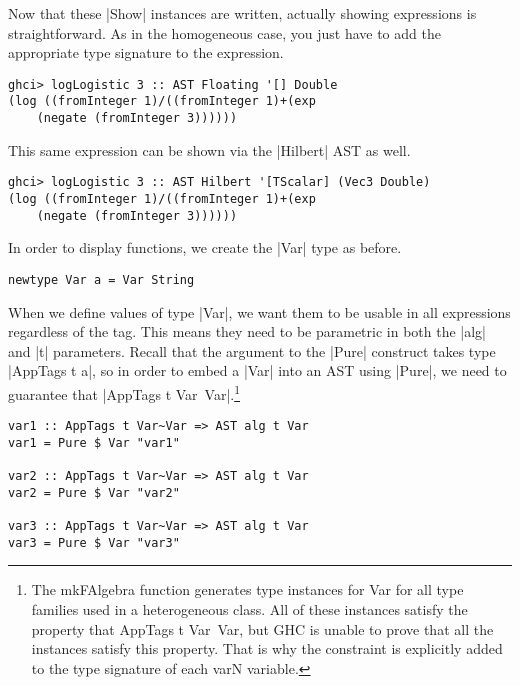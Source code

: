 \documentclass[preprint]{sigplanconf}
\theoremstyle{definition}
\begin{document}
Now that these |Show| instances are written,
actually showing expressions is straightforward.
As in the homogeneous case,
you just have to add the appropriate type signature to the expression.
\begin{lstlisting}
ghci> logLogistic 3 :: AST Floating '[] Double
(log ((fromInteger 1)/((fromInteger 1)+(exp
    (negate (fromInteger 3))))))
\end{lstlisting}
This same expression can be shown via the |Hilbert| AST as well.
\begin{lstlisting}
ghci> logLogistic 3 :: AST Hilbert '[TScalar] (Vec3 Double)
(log ((fromInteger 1)/((fromInteger 1)+(exp
    (negate (fromInteger 3))))))
\end{lstlisting}
In order to display functions,
we create the |Var| type as before.
\begin{lstlisting}
newtype Var a = Var String
\end{lstlisting}
When we define values of type |Var|,
we want them to be usable in all expressions regardless of the tag.
This means they need to be parametric in both the |alg| and |t| parameters.
Recall that the argument to the |Pure| construct takes type |AppTags t a|,
so in order to embed a |Var| into an AST using |Pure|,
we need to guarantee that |AppTags t Var~Var|.\footnote{The {\ttfamily mkFAlgebra} function generates type instances for {\ttfamily Var} for all type families used in a heterogeneous class.
All of these instances satisfy the property that {\ttfamily AppTags t Var~Var},
but GHC is unable to prove that all the instances satisfy this property.
That is why the constraint is explicitly added to the type signature of each {\ttfamily varN} variable.
}
\begin{lstlisting}
var1 :: AppTags t Var~Var => AST alg t Var
var1 = Pure $ Var "var1"

var2 :: AppTags t Var~Var => AST alg t Var
var2 = Pure $ Var "var2"

var3 :: AppTags t Var~Var => AST alg t Var
var3 = Pure $ Var "var3"
\end{lstlisting}
\end{document}
